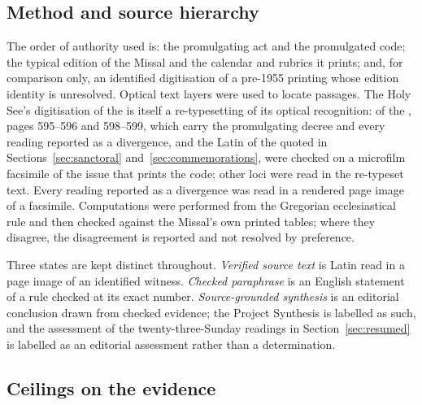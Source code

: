 \subsection{Method and source hierarchy}

The order of authority used is: the promulgating act and the promulgated code; the typical
edition of the Missal and the calendar and rubrics it prints; and, for comparison only, an
identified digitisation of a pre-1955 printing whose edition identity is unresolved. Optical
text layers were used to locate passages. The Holy See's digitisation of the  is
itself a re-typesetting of its optical recognition: of the , pages 595--596 and
598--599, which carry the promulgating decree and every  reading reported as a
divergence, and the Latin of the  quoted in Sections~\ref{sec:sanctoral}
and~\ref{sec:commemorations}, were checked on a microfilm facsimile of the issue that prints
the code; other  loci were read in the re-typeset text. Every reading reported as a
divergence was read in a rendered page image of a facsimile. Computations were performed from the
Gregorian ecclesiastical rule and then checked against the Missal's own printed tables; where
they disagree, the disagreement is reported and not resolved by preference.

Three states are kept distinct throughout. \emph{Verified source text} is Latin read in a page
image of an identified witness. \emph{Checked paraphrase} is an English statement of a rule
checked at its exact number. \emph{Source-grounded synthesis} is an editorial conclusion drawn
from checked evidence; the Project Synthesis is labelled as such, and the assessment of the
twenty-three-Sunday readings in Section~\ref{sec:resumed} is labelled as an editorial assessment
rather than a determination.

\subsection{Ceilings on the evidence}

